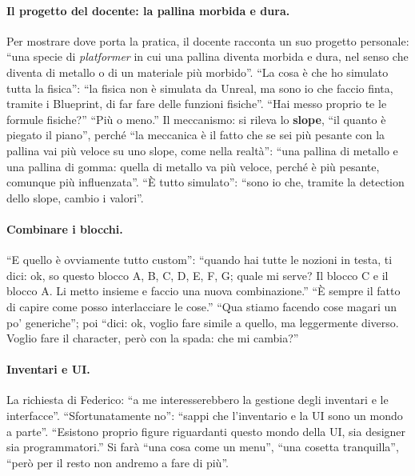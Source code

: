 \paragraph{Il progetto del docente: la pallina morbida e dura.} Per mostrare dove porta
la pratica, il docente racconta un suo progetto personale: ``una specie di
\emph{platformer} in cui una pallina diventa morbida e dura, nel senso che diventa di
metallo o di un materiale più morbido''. ``La cosa è che ho simulato tutta la fisica'':
``la fisica non è simulata da Unreal, ma sono io che faccio finta, tramite i Blueprint, di
far fare delle funzioni fisiche''. ``Hai messo proprio te le formule fisiche?'' ``Più o
meno.'' Il meccanismo: si rileva lo \textbf{slope}, ``il quanto è piegato il piano'',
perché ``la meccanica è il fatto che se sei più pesante con la pallina vai più veloce su
uno slope, come nella realtà'': ``una pallina di metallo e una pallina di gomma: quella di
metallo va più veloce, perché è più pesante, comunque più influenzata''. ``È tutto
simulato'': ``sono io che, tramite la detection dello slope, cambio i valori''.

\paragraph{Combinare i blocchi.} ``E quello è ovviamente tutto custom'': ``quando hai
tutte le nozioni in testa, ti dici: ok, so questo blocco A, B, C, D, E, F, G; quale mi
serve? Il blocco C e il blocco A. Li metto insieme e faccio una nuova combinazione.''
``È sempre il fatto di capire come posso interlacciare le cose.'' ``Qua stiamo facendo
cose magari un po' generiche''; poi ``dici: ok, voglio fare simile a quello, ma
leggermente diverso. Voglio fare il character, però con la spada: che mi cambia?''

\paragraph{Inventari e UI.} La richiesta di Federico: ``a me interesserebbero la gestione
degli inventari e le interfacce''. ``Sfortunatamente no'': ``sappi che l'inventario e la
UI sono un mondo a parte''. ``Esistono proprio figure riguardanti questo mondo della UI,
sia designer sia programmatori.'' Si farà ``una cosa come un menu'', ``una cosetta
tranquilla'', ``però per il resto non andremo a fare di più''.

